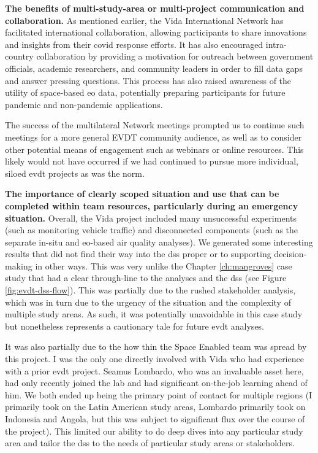 \textbf{The benefits of multi-study-area or multi-project communication and collaboration.} As mentioned earlier, the Vida International Network has facilitated international collaboration, allowing participants to share innovations and insights from their \ac{covid} response efforts. It has also encouraged intra-country collaboration by providing a motivation for outreach between government officials, academic researchers, and community leaders in order to fill data gaps and answer pressing questions. This process has also raised awareness of the utility of space-based \ac{eo} data, potentially preparing participants for future pandemic and non-pandemic applications. 

The success of the multilateral Network meetings prompted us to continue such meetings for a more general EVDT community audience, as well as to consider other potential means of engagement such as webinars or online resources. This likely would not have occurred if we had continued to pursue more individual, siloed \ac{evdt} projects as was the norm.

\textbf{The importance of clearly scoped situation and use that can be completed within team resources, particularly during an emergency situation.} Overall, the Vida project included many unsuccessful experiments (such as monitoring vehicle traffic) and disconnected components (such as the separate in-situ and \ac{eo}-based air quality analyses). We generated some interesting results that did not find their way into the \ac{dss} proper or to supporting decision-making in other ways. This was very unlike the Chapter \ref{ch:mangroves} case study that had a clear through-line to the analyses and the \ac{dss} (see Figure \ref{fig:evdt-dss-flow}). This was partially due to the rushed stakeholder analysis, which was in turn due to the urgency of the situation and the complexity of multiple study areas. As such, it was potentially unavoidable in this case study but nonetheless represents a cautionary tale for future \ac{evdt} analyses.

It was also partially due to the how thin the Space Enabled team was spread by this project. I was the only one directly involved with Vida who had experience with a prior \ac{evdt} project. Seamus Lombardo, who was an invaluable asset here, had only recently joined the lab and had significant on-the-job learning ahead of him. We both ended up being the primary point of contact for multiple regions (I primarily took on the Latin American study areas, Lombardo primarily took on Indonesia and Angola, but this was subject to significant flux over the course of the project). This limited our ability to do deep dives into any particular study area and tailor the \ac{dss} to the needs of particular study areas or stakeholders.

